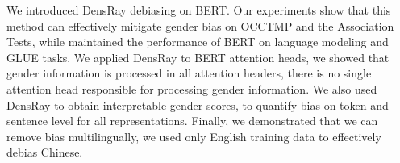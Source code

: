 We introduced DensRay debiasing on BERT. Our experiments
show that this method can effectively mitigate gender bias on OCCTMP and the Association Tests, while maintained the performance of BERT on language modeling and GLUE tasks. We applied DensRay to BERT attention heads, we showed that gender information is processed in all attention headers, there is no single attention head responsible for processing gender information. We also used DensRay to obtain interpretable gender scores, to quantify bias on token and sentence level for all representations. Finally, we demonstrated that we can remove bias multilingually, we used only English training data to effectively debias Chinese. 


